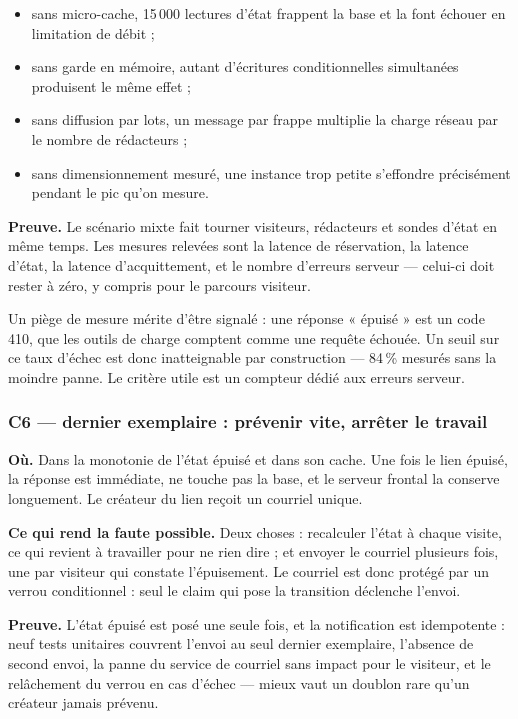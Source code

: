 \begin{itemize}[leftmargin=1.4em,itemsep=2pt]
  \item sans micro-cache, 15\,000 lectures d'état frappent la base et la font
        échouer en limitation de débit ;
  \item sans garde en mémoire, autant d'écritures conditionnelles simultanées
        produisent le même effet ;
  \item sans diffusion par lots, un message par frappe multiplie la charge
        réseau par le nombre de rédacteurs ;
  \item sans dimensionnement mesuré, une instance trop petite s'effondre
        précisément pendant le pic qu'on mesure.
\end{itemize}

\textbf{Preuve.} Le scénario mixte fait tourner visiteurs, rédacteurs et sondes
d'état en même temps. Les mesures relevées sont la latence de réservation, la
latence d'état, la latence d'acquittement, et le nombre d'erreurs serveur —
celui-ci doit rester à zéro, y compris pour le parcours visiteur.

Un piège de mesure mérite d'être signalé : une réponse « épuisé » est un code 410,
que les outils de charge comptent comme une requête échouée. Un seuil sur ce taux
d'échec est donc inatteignable par construction — 84\,\% mesurés sans la moindre
panne. Le critère utile est un compteur dédié aux erreurs serveur.

\subsubsection{C6 — dernier exemplaire : prévenir vite, arrêter le travail}

\textbf{Où.} Dans la monotonie de l'état épuisé et dans son cache. Une fois le
lien épuisé, la réponse est immédiate, ne touche pas la base, et le serveur
frontal la conserve longuement. Le créateur du lien reçoit un courriel unique.

\textbf{Ce qui rend la faute possible.} Deux choses : recalculer l'état à chaque
visite, ce qui revient à travailler pour ne rien dire ; et envoyer le courriel
plusieurs fois, une par visiteur qui constate l'épuisement. Le courriel est donc
protégé par un verrou conditionnel : seul le claim qui pose la transition
déclenche l'envoi.

\textbf{Preuve.} L'état épuisé est posé une seule fois, et la notification est
idempotente : neuf tests unitaires couvrent l'envoi au seul dernier exemplaire,
l'absence de second envoi, la panne du service de courriel sans impact pour le
visiteur, et le relâchement du verrou en cas d'échec — mieux vaut un doublon rare
qu'un créateur jamais prévenu.

